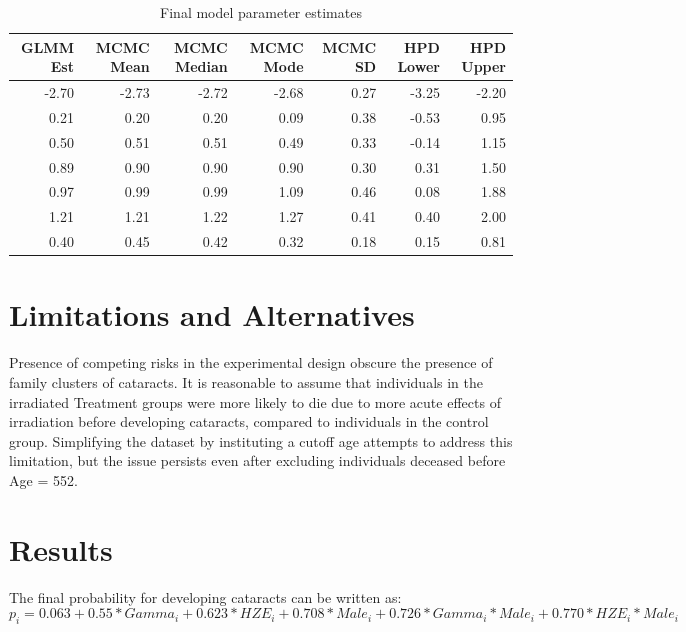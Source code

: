 \documentclass[12pt]{article}
\begin{document}
\begin{table}[H]
\centering
\begin{tabular}{rrrrrrr}
  \toprule
GLMM Est & MCMC Mean & MCMC Median & MCMC Mode & MCMC SD & HPD Lower & HPD Upper \\ 
  \midrule
-2.70 & -2.73 & -2.72 & -2.68 & 0.27 & -3.25 & -2.20 \\ 
  0.21 & 0.20 & 0.20 & 0.09 & 0.38 & -0.53 & 0.95 \\ 
  0.50 & 0.51 & 0.51 & 0.49 & 0.33 & -0.14 & 1.15 \\ 
  0.89 & 0.90 & 0.90 & 0.90 & 0.30 & 0.31 & 1.50 \\ 
  0.97 & 0.99 & 0.99 & 1.09 & 0.46 & 0.08 & 1.88 \\ 
  1.21 & 1.21 & 1.22 & 1.27 & 0.41 & 0.40 & 2.00 \\ 
  0.40 & 0.45 & 0.42 & 0.32 & 0.18 & 0.15 & 0.81 \\ 
   \bottomrule
\end{tabular}
\caption{Final model parameter estimates} 
\end{table}

\section{Limitations and Alternatives}
\label{sec:limits}

Presence of competing risks in the experimental design obscure the presence of family clusters of cataracts. It is reasonable to assume that individuals in the irradiated Treatment groups were more likely to die due to more acute effects of irradiation before developing cataracts, compared to individuals in the control group. Simplifying the dataset by instituting a cutoff age attempts to address this limitation, but the issue persists even after excluding individuals deceased before Age = 552.

\section{Results}
\label{sec:results}

The final probability for developing cataracts can be written as:\\
\begin{equation}
p_i = 0.063 + 0.55*Gamma_i + 0.623*HZE_i + 0.708*Male_i + 0.726*Gamma_i*Male_i + 0.770*HZE_i*Male_i
\label{eq:probs}
\end{equation}
\end{document}

